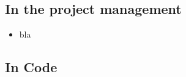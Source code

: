 
\subsection{In the project management}
\begin{itemize}
\item bla
\end{itemize}

\subsection{In Code}


